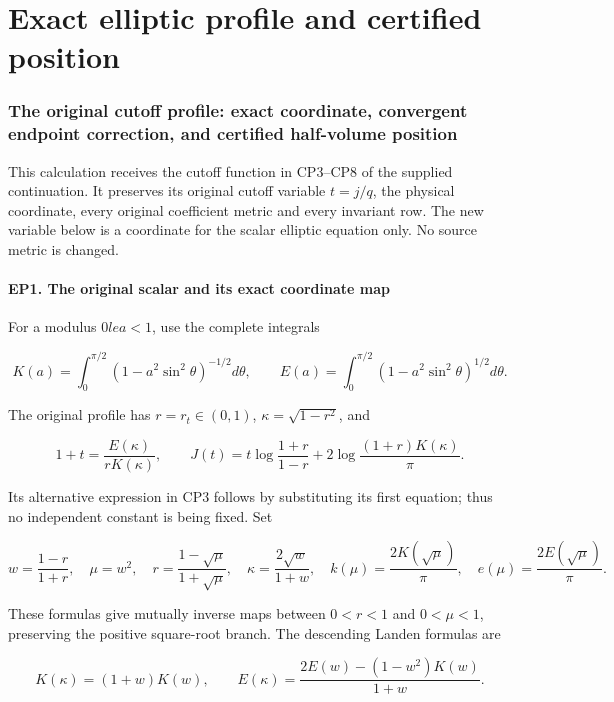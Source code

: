 \documentclass[10pt]{article}
\begin{document}
\clearpage\part{Exact elliptic profile and certified position}
\section{The original cutoff profile: exact coordinate, convergent endpoint correction, and certified half-volume position}\label{the-original-cutoff-profile-exact-coordinate-convergent-endpoint-correction-and-certified-half-volume-position}

This calculation receives the cutoff function in CP3--CP8 of the supplied continuation. It preserves its original cutoff variable \(t=j/q\), the physical coordinate, every original coefficient metric and every invariant row. The new variable below is a coordinate for the scalar elliptic equation only. No source metric is changed.

\subsection{EP1. The original scalar and its exact coordinate map}\label{ep1.-the-original-scalar-and-its-exact-coordinate-map}

For a modulus \(0le a<1\), use the complete integrals

\[
 K(a)=\int_0^{\pi/2}(1-a^2\sin^2\theta)^{-1/2}d\theta,
 \qquad E(a)=\int_0^{\pi/2}(1-a^2\sin^2\theta)^{1/2}d\theta.
 \tag{EP1}
\]

The original profile has \(r=r_t\in(0,1)\), \(\kappa=\sqrt{1-r^2}\), and

\[
 1+t=\frac{E(\kappa)}{rK(\kappa)},\qquad
 J(t)=t\log\frac{1+r}{1-r}+2\log\frac{(1+r)K(\kappa)}\pi.
 \tag{EP2}
\]

Its alternative expression in CP3 follows by substituting its first equation; thus no independent constant is being fixed. Set

\[
 w=\frac{1-r}{1+r},\quad \mu=w^2,\quad
 r=\frac{1-\sqrt\mu}{1+\sqrt\mu},\quad
 \kappa=\frac{2\sqrt w}{1+w},\quad
 k(\mu)=\frac{2K(\sqrt\mu)}\pi,
 \quad e(\mu)=\frac{2E(\sqrt\mu)}\pi.
 \tag{EP3}
\]

These formulas give mutually inverse maps between \(0<r<1\) and \(0<\mu<1\), preserving the positive square-root branch. The descending Landen formulas are

\[
 K(\kappa)=(1+w)K(w),\qquad
 E(\kappa)=\frac{2E(w)-(1-w^2)K(w)}{1+w}.
 \tag{EP4}
\]
\end{document}
